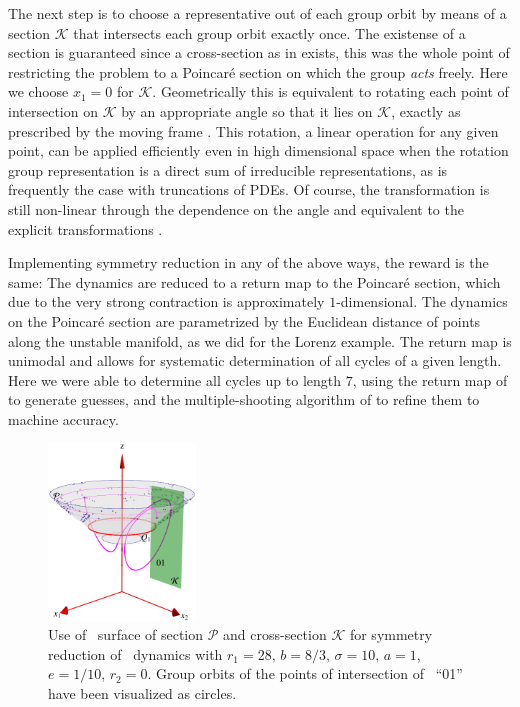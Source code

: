 The next step is to choose a representative out of each group orbit by means of a section $\mathcal{K}$ that intersects each group orbit
exactly once. The existense of a section is guaranteed since a cross-section as in  exists,
this was the whole point of restricting the problem to a Poincar\'e section
on which the group \emph{acts} freely. Here we choose $x_1=0$ for $\mathcal{K}$. Geometrically
this is equivalent to rotating each point of intersection on $\mathcal{K}$ by
an appropriate angle so that it lies on $\mathcal{K}$, exactly as prescribed by
the moving frame . This rotation, a linear operation for any given point,
can be applied efficiently even in high dimensional space when the rotation group representation is a direct
sum of irreducible representations, as is frequently the case with truncations of PDEs.
Of course, the transformation is still non-linear through the dependence on the angle and equivalent
to the explicit transformations .

Implementing symmetry reduction in any of the above ways, the reward is the same: The
dynamics are reduced to a return map to the Poincar\'e section, which due to
the very strong contraction is approximately $1$-dimensional. The dynamics on the Poincar\'e
section are parametrized by the Euclidean distance of points along the unstable manifold, as we did
for the Lorenz example.
The return map is unimodal and allows for systematic determination of all cycles of
a given length. Here we were able to determine all cycles up to length $7$, using
the return map of  to generate guesses, and the multiple-shooting
algorithm of  to refine them to machine accuracy.

\begin{figure}[ht]
\begin{center}
  \includegraphics[width=0.35\textwidth]{../figs/CLEmartini}
\end{center}
\caption[\CLe\ desymmetrization with double section]{Use of \Poincare\
surface of section $\mathcal{P}$ and cross-section $\mathcal{K}$ for symmetry
reduction of \CLe\ dynamics with $r_1=28,\, b=8/3,\, \sigma=10,\, a=1$, $e=1/10$, $r_2=0$.
Group orbits of the points of intersection of \rpo\ ``01'' have been visualized as circles.
    }
\label{fig:CLEmartini}
\end{figure}


